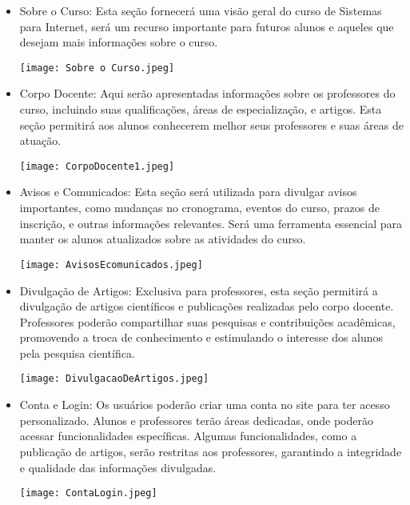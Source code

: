\documentclass[a4paper,12pt]{report}
\begin{document}
\begin{itemize} 
    \item Sobre o Curso: Esta seção fornecerá uma visão geral do curso de Sistemas para Internet, será um recurso importante para futuros alunos e aqueles que desejam mais informações sobre o curso.
    \begin{center}
        \texttt{[image: Sobre o Curso.jpeg]}
    \end{center}
 
    \item Corpo Docente: Aqui serão apresentadas informações sobre os professores do curso, incluindo suas qualificações, áreas de especialização, e artigos. Esta seção permitirá aos alunos conhecerem melhor seus professores e suas áreas de atuação.
    \begin{center}
        \texttt{[image: CorpoDocente1.jpeg]}
    \end{center}
 
    \item Avisos e Comunicados: Esta seção será utilizada para divulgar avisos importantes, como mudanças no cronograma, eventos do curso, prazos de inscrição, e outras informações relevantes. Será uma ferramenta essencial para manter os alunos atualizados sobre as atividades do curso.
    \begin{center}
        \texttt{[image: AvisosEcomunicados.jpeg]}
    \end{center}
 
    \item Divulgação de Artigos: Exclusiva para professores, esta seção permitirá a divulgação de artigos científicos e publicações realizadas pelo corpo docente. Professores poderão compartilhar suas pesquisas e contribuições acadêmicas, promovendo a troca de conhecimento e estimulando o interesse dos alunos pela pesquisa científica.
    \begin{center}
        \texttt{[image: DivulgacaoDeArtigos.jpeg]}
    \end{center}
 
    \item Conta e Login: Os usuários poderão criar uma conta no site para ter acesso personalizado. Alunos e professores terão áreas dedicadas, onde poderão acessar funcionalidades específicas. Algumas funcionalidades, como a publicação de artigos, serão restritas aos professores, garantindo a integridade e qualidade das informações divulgadas.
    \begin{center}
        \texttt{[image: ContaLogin.jpeg]}
    \end{center}
\end{itemize}
\end{document}
